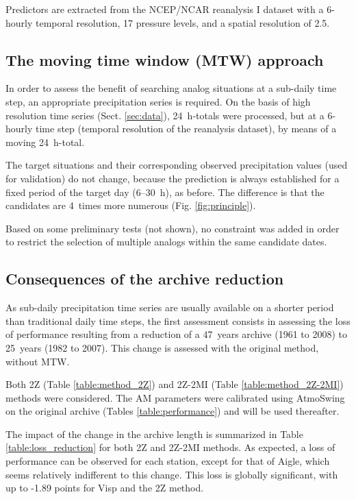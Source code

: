 \documentclass[hess, manuscript]{copernicus}
\begin{document}
Predictors are extracted from the NCEP/NCAR reanalysis I \citep{Kalnay1996} dataset with a 6-hourly temporal resolution, 17 pressure levels, and a spatial resolution of 2.5\degree.


\subsection{The moving time window (MTW) approach}
\label{sec:method}

In order to assess the benefit of searching analog situations at a sub-daily time step, an appropriate precipitation series is required. On the basis of high resolution time series (Sect. \ref{sec:data}), 24~h-totals were processed, but at a 6-hourly time step (temporal resolution of the reanalysis dataset), by means of a moving 24~h-total. 

The target situations and their corresponding observed precipitation values (used for validation) do not change, because the prediction is always established for a fixed period of the target day (6--30~h), as before. The difference is that the candidates are 4~times more numerous (Fig. \ref{fig:principle}).

Based on some preliminary tests (not shown), no constraint was added in order to restrict the selection of multiple analogs within the same candidate dates.


\subsection{Consequences of the archive reduction}
\label{sec:archive_reduction}

As sub-daily precipitation time series are usually available on a shorter period than traditional daily time steps, the first assessment consists in assessing the loss of performance resulting from a reduction of a 47~years archive (1961 to 2008) to 25~years (1982 to 2007). This change is assessed with the original method, without MTW.

Both 2Z (Table \ref{table:method_2Z}) and 2Z-2MI (Table \ref{table:method_2Z-2MI}) methods were considered. The AM parameters were calibrated using AtmoSwing \citep{Horton2016} on the original archive (Tables \ref{table:performance}) and will be used thereafter.

The impact of the change in the archive length is summarized in Table \ref{table:loss_reduction} for both 2Z and 2Z-2MI methods. As expected, a loss of performance can be observed for each station, except for that of Aigle, which seems relatively indifferent to this change. This loss is globally significant, with up to -1.89 points for Visp and the 2Z method. 
\end{document}
